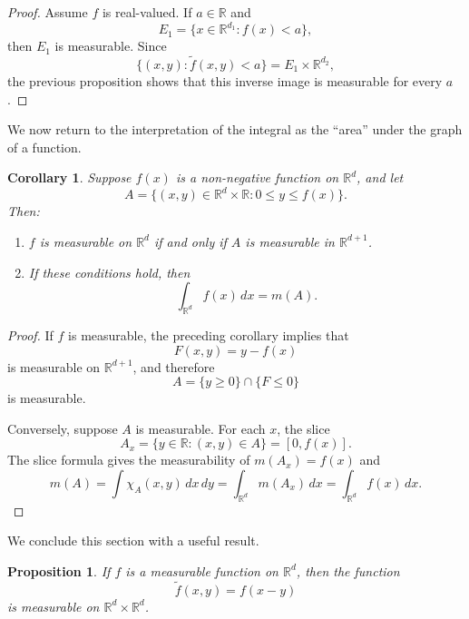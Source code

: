 \documentclass[11pt,openany]{book}
\newtheorem{corollary}[theorem]{Corollary}
\newtheorem{proposition}[theorem]{Proposition}
\begin{document}
\begin{proof}
Assume $f$ is real-valued. If $a\in\mathbb{R}$ and
\[
E_1=\{x\in\mathbb{R}^{d_1}:f(x)<a\},
\]
then $E_1$ is measurable. Since
\[
\{(x,y):\widetilde f(x,y)<a\}=E_1\times\mathbb{R}^{d_2},
\]
the previous proposition shows that this inverse image is measurable for every $a$.
\end{proof}

We now return to the interpretation of the integral as the ``area'' under the graph of a function.

\begin{corollary}
Suppose $f(x)$ is a non-negative function on $\mathbb{R}^d$, and let
\[
A=\{(x,y)\in\mathbb{R}^d\times\mathbb{R}:0\leq y\leq f(x)\}.
\]
Then:
\begin{enumerate}
\item[(i)] $f$ is measurable on $\mathbb{R}^d$ if and only if $A$ is measurable in $\mathbb{R}^{d+1}$.
\item[(ii)] If these conditions hold, then
\[
\int_{\mathbb{R}^d}f(x)\,dx=m(A).
\]
\end{enumerate}
\end{corollary}

\begin{proof}
If $f$ is measurable, the preceding corollary implies that
\[
F(x,y)=y-f(x)
\]
is measurable on $\mathbb{R}^{d+1}$, and therefore
\[
A=\{y\geq0\}\cap\{F\leq0\}
\]
is measurable.

Conversely, suppose $A$ is measurable. For each $x$, the slice
\[
A_x=\{y\in\mathbb{R}:(x,y)\in A\}=[0,f(x)].
\]
The slice formula gives the measurability of $m(A_x)=f(x)$ and
\[
m(A)
=\int\chi_A(x,y)\,dx\,dy
=\int_{\mathbb{R}^d}m(A_x)\,dx
=\int_{\mathbb{R}^d}f(x)\,dx.
\]
\end{proof}

We conclude this section with a useful result.

\begin{proposition}
If $f$ is a measurable function on $\mathbb{R}^d$, then the function
\[
\widetilde f(x,y)=f(x-y)
\]
is measurable on $\mathbb{R}^d\times\mathbb{R}^d$.
\end{proposition}
\end{document}
